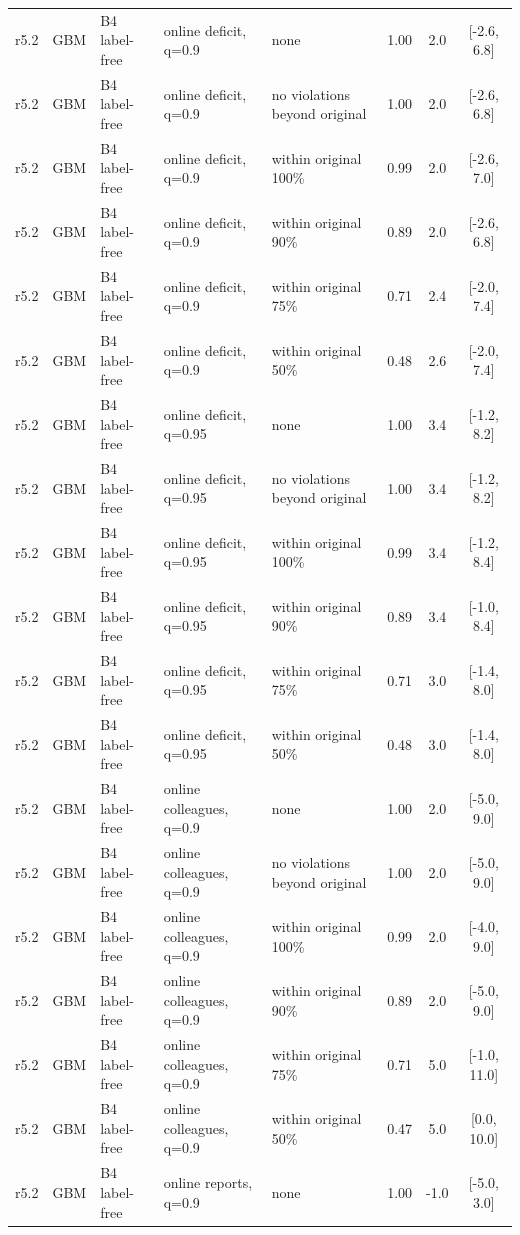 \documentclass[10pt,onecolumn,letterpaper]{article}
\begin{document}
\begin{longtable}{lllp{4.2cm}p{3.4cm}ccc}
r5.2 & GBM & B4 label-free & online deficit, q=0.9 & none & 1.00 & 2.0 & [-2.6, 6.8] \\
r5.2 & GBM & B4 label-free & online deficit, q=0.9 & no violations beyond original & 1.00 & 2.0 & [-2.6, 6.8] \\
r5.2 & GBM & B4 label-free & online deficit, q=0.9 & within original 100\% & 0.99 & 2.0 & [-2.6, 7.0] \\
r5.2 & GBM & B4 label-free & online deficit, q=0.9 & within original 90\% & 0.89 & 2.0 & [-2.6, 6.8] \\
r5.2 & GBM & B4 label-free & online deficit, q=0.9 & within original 75\% & 0.71 & 2.4 & [-2.0, 7.4] \\
r5.2 & GBM & B4 label-free & online deficit, q=0.9 & within original 50\% & 0.48 & 2.6 & [-2.0, 7.4] \\
r5.2 & GBM & B4 label-free & online deficit, q=0.95 & none & 1.00 & 3.4 & [-1.2, 8.2] \\
r5.2 & GBM & B4 label-free & online deficit, q=0.95 & no violations beyond original & 1.00 & 3.4 & [-1.2, 8.2] \\
r5.2 & GBM & B4 label-free & online deficit, q=0.95 & within original 100\% & 0.99 & 3.4 & [-1.2, 8.4] \\
r5.2 & GBM & B4 label-free & online deficit, q=0.95 & within original 90\% & 0.89 & 3.4 & [-1.0, 8.4] \\
r5.2 & GBM & B4 label-free & online deficit, q=0.95 & within original 75\% & 0.71 & 3.0 & [-1.4, 8.0] \\
r5.2 & GBM & B4 label-free & online deficit, q=0.95 & within original 50\% & 0.48 & 3.0 & [-1.4, 8.0] \\
r5.2 & GBM & B4 label-free & online colleagues, q=0.9 & none & 1.00 & 2.0 & [-5.0, 9.0] \\
r5.2 & GBM & B4 label-free & online colleagues, q=0.9 & no violations beyond original & 1.00 & 2.0 & [-5.0, 9.0] \\
r5.2 & GBM & B4 label-free & online colleagues, q=0.9 & within original 100\% & 0.99 & 2.0 & [-4.0, 9.0] \\
r5.2 & GBM & B4 label-free & online colleagues, q=0.9 & within original 90\% & 0.89 & 2.0 & [-5.0, 9.0] \\
r5.2 & GBM & B4 label-free & online colleagues, q=0.9 & within original 75\% & 0.71 & 5.0 & [-1.0, 11.0] \\
r5.2 & GBM & B4 label-free & online colleagues, q=0.9 & within original 50\% & 0.47 & 5.0 & [0.0, 10.0] \\
r5.2 & GBM & B4 label-free & online reports, q=0.9 & none & 1.00 & -1.0 & [-5.0, 3.0] \\

\end{longtable}
\end{document}
